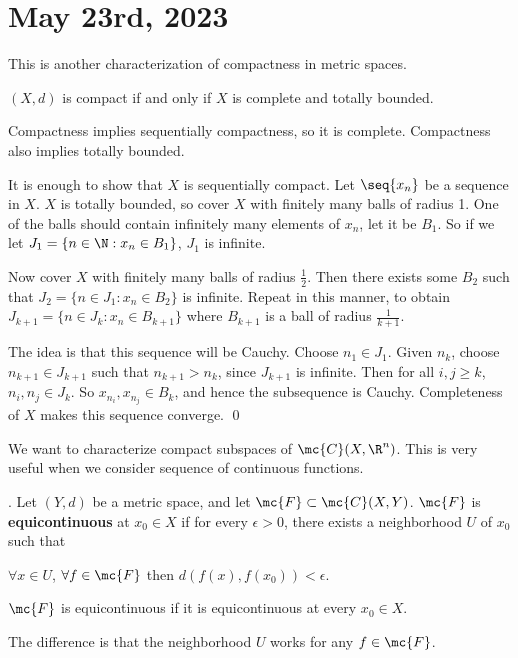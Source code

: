 \section*{May 23rd, 2023}

This is another characterization of compactness in metric spaces.

 \((X, d)\) is compact if and only if \(X\) is complete and totally bounded.

\pf \note{\mimp} Compactness implies sequentially compactness, so it is complete. Compactness also implies totally bounded.

\note{\mimpd} It is enough to show that \(X\) is sequentially compact. Let \(\seq{x_n}\) be a sequence in \(X\). \(X\) is totally bounded, so cover \(X\) with finitely many balls of radius 1. One of the balls should contain infinitely many elements of \(x_n\), let it be \(B_1\). So if we let \(J_1 = \{n \in \N : x_n \in B_1\}\), \(J_1\) is infinite.

Now cover \(X\) with finitely many balls of radius \(\frac{1}{2}\). Then there exists some \(B_2\) such that \(J_2 = \{n \in J_1 : x_n \in B_2\}\) is infinite. Repeat in this manner, to obtain \(J_{k+1} = \{n \in J_{k} : x_n \in B_{k+1}\}\) where \(B_{k+1}\) is a ball of radius \(\frac{1}{k+1}\).

The idea is that this sequence will be Cauchy. Choose \(n_1 \in J_1\). Given \(n_k\), choose \(n_{k+1} \in J_{k+1}\) such that \(n_{k+1} > n_k\), since \(J_{k+1}\) is infinite. Then for all \(i, j \geq k\), \(n_i, n_j \in J_k\). So \(x_{n_i}, x_{n_j} \in B_k\), and hence the subsequence is Cauchy. Completeness of \(X\) makes this sequence converge. \qed

We want to characterize compact subspaces of \(\mc{C}(X, \R^n)\). This is very useful when we consider sequence of continuous functions.

.  Let \((Y, d)\) be a metric space, and let \(\mc{F} \subset \mc{C}(X, Y)\). \(\mc{F}\) is \textbf{equicontinuous} at \(x_0 \in X\) if for every \(\epsilon > 0\), there exists a neighborhood \(U\) of \(x_0\) such that
\begin{center}
    \(\forall x \in U\), \(\forall f \in \mc{F}\) then \(d(f(x), f(x_0)) < \epsilon\).
\end{center}
\(\mc{F}\) is equicontinuous if it is equicontinuous at every \(x_0 \in X\).

The difference is that the neighborhood \(U\) works for any \(f \in \mc{F}\).

